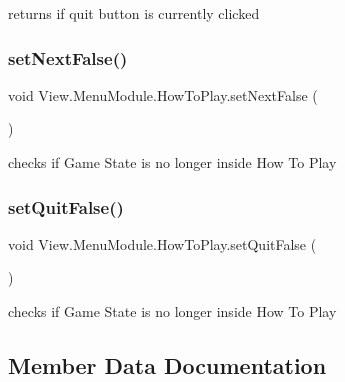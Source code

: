 returns if quit button is currently clicked \hypertarget{class_view_1_1_menu_module_1_1_how_to_play_a69475818d4ea1d67f02abd8b88ba912f}{}\label{class_view_1_1_menu_module_1_1_how_to_play_a69475818d4ea1d67f02abd8b88ba912f} 
\subsubsection{\texorpdfstring{set\+Next\+False()}{setNextFalse()}}
{\footnotesize\ttfamily void View.\+Menu\+Module.\+How\+To\+Play.\+set\+Next\+False (\begin{DoxyParamCaption}{ }\end{DoxyParamCaption})\hspace{0.3cm}{\ttfamily [inline]}}

checks if Game State is no longer inside How To Play \hypertarget{class_view_1_1_menu_module_1_1_how_to_play_a0af74e6533be263c25e9f62a50135b43}{}\label{class_view_1_1_menu_module_1_1_how_to_play_a0af74e6533be263c25e9f62a50135b43} 
\subsubsection{\texorpdfstring{set\+Quit\+False()}{setQuitFalse()}}
{\footnotesize\ttfamily void View.\+Menu\+Module.\+How\+To\+Play.\+set\+Quit\+False (\begin{DoxyParamCaption}{ }\end{DoxyParamCaption})\hspace{0.3cm}{\ttfamily [inline]}}

checks if Game State is no longer inside How To Play 

\subsection{Member Data Documentation}
\hypertarget{class_view_1_1_menu_module_1_1_how_to_play_aa27b8e6545eddc0a338df1a0ac60eeb1}{}\label{class_view_1_1_menu_module_1_1_how_to_play_aa27b8e6545eddc0a338df1a0ac60eeb1} 
